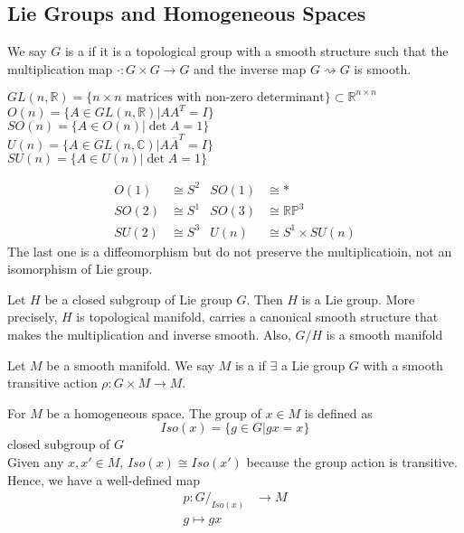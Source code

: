 
\subsection{Lie Groups and Homogeneous Spaces}

\begin{definition}
    We say  $ G  $ is a  if it is a topological group with a smooth structure such that the multiplication map $ \cdot : G \times G \to G $ and the inverse map  $ G\rightsquigarrow G  $  is smooth. 
\end{definition}
\begin{example}
     $ GL(n,\mathbb{R})=\{n\times n \text{ matrices with non-zero determinant}\}\subset \mathbb{R}^{n\times n } $\\
      $ O(n)=\{A\in GL(n,\mathbb{R})|AA^T=I\} $\\
       $ SO(n)=\{A\in O(n)|\det A=1\} $\\
        $ U(n)=\{A\in GL(n,\mathbb{C})|A\overline{A}^T=I\} $\\
         $ SU(n)=\{A\in U(n)|\det A=1\} $     
\end{example}
\begin{exercise}
    \begin{align}
        O(1)&\cong S^2 &SO(1)&\cong *\\
            SO(2)&\cong S^1 &SO(3)&\cong \mathbb{R}\mathbb{P}^3 \\
            SU(2)&\cong S^3 &U(n)&\cong S^1\times SU(n)
    \end{align}
    The last one is a diffeomorphism but do not preserve the multiplicatioin, \ie not an isomorphism of Lie group.
\end{exercise}
\begin{theorem}[Carton]
    Let  $ H  $ be a closed subgroup of Lie group  $ G  $. Then  $ H  $ is a Lie group. More precisely,  $ H  $ is topological manifold, carries a canonical smooth structure that makes  the multiplication and inverse smooth. Also,  $ G/H  $ is a smooth manifold
\end{theorem}
\begin{definition}
    Let  $ M  $ be a smooth manifold. We say   $ M  $ is a  if  $ \exists  $ a Lie group 
     $ G  $ with a smooth transitive action $ \rho: G\times M \rightarrow M  $.
\end{definition}
\begin{definition}
    For  $ M  $ be a homogeneous space.
    The  group of  $ x\in M  $ is defined as 
    \[Iso(x)=\{g\in G|gx=x\}\]
    closed subgroup of  $ G $\\
    Given any  $ x,x'\in M  $,  $ Iso(x)\cong Iso(x') $ because the group  action is transitive. \\
    Hence, we have a well-defined map 
    \begin{align}
        p:G/_{Iso(x)}&\rightarrow M \\
        g\mapsto gx
    \end{align}
\end{definition}
